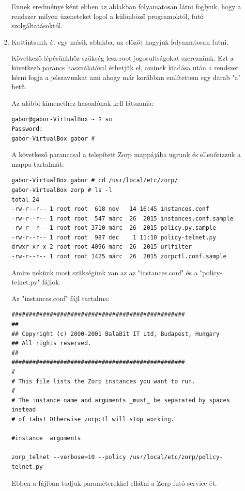 \documentclass[a4paper,12pt,oneside]{report}
\begin{document}
\begin{enumerate}
Ennek eredménye ként ebben az ablakban folyamatosan látni foglyuk, hogy a rendszer milyen üzeneteket logol a különböző programoktól, futó szolgáltatásoktól.

\item Kattintsunk át egy másik ablakba, az előzőt hagyjuk folyamatosan futni.

Következő lépésünkhöz szükség lesz root jogosultságokat szereznünk.
Ezt a következő parancs használatával érhetjük el, aminek kiadása után a rendszer kérni fogja a jelszavunkat ami ahogy már korábban említettem egy darab "a" betű.

Az alábbi kimenethez hasonlónak kell látszania:

\begin{lstlisting}
gabor@gabor-VirtualBox ~ $ su
Password:
gabor-VirtualBox gabor #
\end{lstlisting}

A következő paranccsal a telepített Zorp mappájába ugrunk és ellenőrizzük a mappa tartalmát:
\begin{lstlisting}
gabor-VirtualBox gabor # cd /usr/local/etc/zorp/
gabor-VirtualBox zorp # ls -l
total 24
-rw-r--r-- 1 root root  618 nov   14 16:45 instances.conf
-rw-r--r-- 1 root root  547 márc  26  2015 instances.conf.sample
-rw-r--r-- 1 root root 3710 márc  26  2015 policy.py.sample
-rw-r--r-- 1 root root  987 dec    1 11:10 policy-telnet.py
drwxr-xr-x 2 root root 4096 márc  26  2015 urlfilter
-rw-r--r-- 1 root root 1425 márc  26  2015 zorpctl.conf.sample
\end{lstlisting}

Amire nekünk most szükségünk van az az "instances.conf" és a "policy-telnet.py" fájlok.

Az "instances.conf" fájl tartalma:
\begin{lstlisting}
##################################################
##
## Copyright (c) 2000-2001 BalaBit IT Ltd, Budapest, Hungary
## All rights reserved.
##
##################################################
#
# This file lists the Zorp instances you want to run.
#
# The instance name and arguments _must_ be separated by spaces instead
# of tabs! Otherwise zorpctl will stop working.

#instance  arguments

zorp_telnet --verbose=10 --policy /usr/local/etc/zorp/policy-telnet.py

\end{lstlisting}

Ebben a fájlban tudjuk paraméterekkel ellátni a Zorp futó service-ét.


\end{enumerate}
\end{document}
